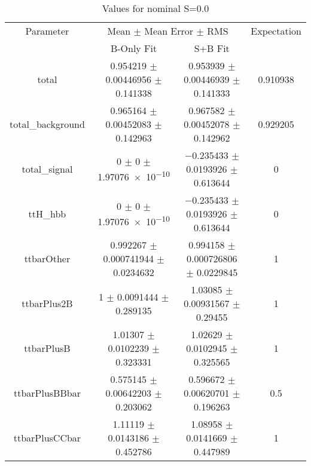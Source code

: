 \begin{table}
\centering
\caption{Values for nominal S=0.0}
\begin{tabular}{cccc}
\toprule
Parameter & \multicolumn{2}{c}{Mean $\pm$ Mean Error $\pm$ RMS} & Expectation\\
 & B-Only Fit & S+B Fit & \\
\midrule
total & \num{0.954219} $\pm$ \num{0.00446956} $\pm$ \num{0.141338} & \num{0.953939} $\pm$ \num{0.00446939} $\pm$ \num{0.141333} & \num{0.910938}\\
total\_background & \num{0.965164} $\pm$ \num{0.00452083} $\pm$ \num{0.142963} & \num{0.967582} $\pm$ \num{0.00452078} $\pm$ \num{0.142962} & \num{0.929205}\\
total\_signal & \num{0} $\pm$ \num{0} $\pm$ \num{1.97076e-10} & \num{-0.235433} $\pm$ \num{0.0193926} $\pm$ \num{0.613644} & \num{0}\\
ttH\_hbb & \num{0} $\pm$ \num{0} $\pm$ \num{1.97076e-10} & \num{-0.235433} $\pm$ \num{0.0193926} $\pm$ \num{0.613644} & \num{0}\\
ttbarOther & \num{0.992267} $\pm$ \num{0.000741944} $\pm$ \num{0.0234632} & \num{0.994158} $\pm$ \num{0.000726806} $\pm$ \num{0.0229845} & \num{1}\\
ttbarPlus2B & \num{1} $\pm$ \num{0.0091444} $\pm$ \num{0.289135} & \num{1.03085} $\pm$ \num{0.00931567} $\pm$ \num{0.29455} & \num{1}\\
ttbarPlusB & \num{1.01307} $\pm$ \num{0.0102239} $\pm$ \num{0.323331} & \num{1.02629} $\pm$ \num{0.0102945} $\pm$ \num{0.325565} & \num{1}\\
ttbarPlusBBbar & \num{0.575145} $\pm$ \num{0.00642203} $\pm$ \num{0.203062} & \num{0.596672} $\pm$ \num{0.00620701} $\pm$ \num{0.196263} & \num{0.5}\\
ttbarPlusCCbar & \num{1.11119} $\pm$ \num{0.0143186} $\pm$ \num{0.452786} & \num{1.08958} $\pm$ \num{0.0141669} $\pm$ \num{0.447989} & \num{1}\\
\bottomrule
\end{tabular}
\end{table}
